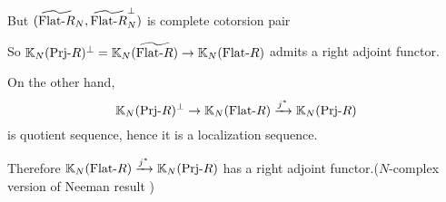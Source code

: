 \documentclass[t,ignorenonframetext]{beamer}
\newcommand{\K}{\mathbb{K} }
\newcommand{\Prj}{{\rm Prj} \mbox{-}}
\newcommand{\Flat}{{\rm Flat} \mbox{-}}
\begin{document}
\begin{frame}
But $(\widetilde{\Flat R}_N,\widetilde{\Flat R}^\perp_N)$ is complete cotorsion pair
\pause

\vspace{0.2cm}
So $\K_N(\Prj R)^\perp=\K_N(\widetilde{\Flat R})\rightarrow \K_N(\Flat R)$ admits a right adjoint functor.
\pause

\vspace{0.2cm}
On the other hand,
$$\K_N(\Prj R)^\perp\rightarrow \K_N(\Flat R)\xrightarrow{j^\ast} \K_N(\Prj R)$$
is quotient sequence, hence it is a localization sequence.

\pause
\vspace{0.2cm}
Therefore $ \K_N(\Flat R)\xrightarrow{j^\ast} \K_N(\Prj R)$ has a right adjoint functor.($N$-complex version of Neeman result \cite[Theorem 0.1]{Neeman2})
\end{frame}
\end{document}
